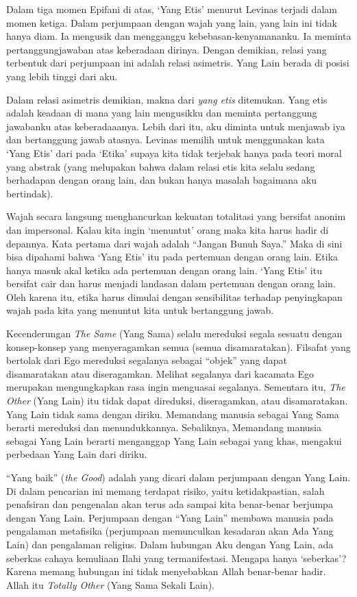 \documentclass[10pt,a4paper]{article}
\begin{document}
\begin{multicols}{2}
Dalam tiga momen Epifani di atas, `Yang Etis' menurut Levinas terjadi
dalam momen ketiga. Dalam perjumpaan dengan wajah yang lain, yang lain
ini tidak hanya diam. Ia mengusik dan mengganggu kebebasan-kenyamananku.
Ia meminta pertanggungjawaban atas keberadaan dirinya. Dengan demikian,
relasi yang terbentuk dari perjumpaan ini adalah relasi asimetris. Yang
Lain berada di posisi yang lebih tinggi dari aku.

Dalam relasi asimetris demikian, makna dari \emph{yang etis} ditemukan.
Yang etis adalah keadaan di mana yang lain mengusikku dan meminta
pertanggung jawabanku atas keberadaaanya. Lebih dari itu, aku diminta
untuk menjawab iya dan bertanggung jawab atasnya. Levinas memilih untuk
menggunakan kata `Yang Etis' dari pada `Etika' supaya kita tidak
terjebak hanya pada teori moral yang abstrak (yang melupakan bahwa dalam
relasi etis kita selalu sedang berhadapan dengan orang lain, dan bukan
hanya masalah bagaimana aku bertindak).

Wajah secara langsung menghancurkan kekuatan totalitasi yang bersifat
anonim dan impersonal. Kalau kita ingin `menuntut' orang maka kita harus
hadir di depannya. Kata pertama dari wajah adalah ``Jangan Bunuh Saya.''
Maka di sini bisa dipahami bahwa `Yang Etis' itu pada pertemuan dengan
orang lain. Etika hanya masuk akal ketika ada pertemuan dengan orang
lain. `Yang Etis' itu bersifat cair dan harus menjadi landasan dalam
pertemuan dengan orang lain. Oleh karena itu, etika harus dimulai dengan
sensibilitas terhadap penyingkapan wajah pada kita yang menuntut kita
untuk bertanggung jawab.

Kecenderungan \emph{The Same} (Yang Sama) selalu mereduksi segala
sesuatu dengan konsep-konsep yang menyeragamkan semua (semua
disamaratakan). Filsafat yang bertolak dari Ego mereduksi segalanya
sebagai ``objek'' yang dapat disamaratakan atau diseragamkan. Melihat
segalanya dari kacamata Ego merupakan mengungkapkan rasa ingin menguasai
segalanya. Sementara itu, \emph{The Other} (Yang Lain) itu tidak dapat
direduksi, diseragamkan, atau disamaratakan. Yang Lain tidak sama dengan
diriku. Memandang manusia sebagai Yang Sama berarti mereduksi dan
menundukkannya. Sebaliknya, Memandang manusia sebagai Yang Lain berarti
menganggap Yang Lain sebagai yang khas, mengakui perbedaan Yang Lain
dari diriku.

``Yang baik'' (\emph{the Good}) adalah yang dicari dalam perjumpaan
dengan Yang Lain. Di dalam pencarian ini memang terdapat risiko, yaitu
ketidakpastian, salah penafsiran dan pengenalan akan terus ada sampai
kita benar-benar berjumpa dengan Yang Lain. Perjumpaan dengan ``Yang
Lain'' membawa manusia pada pengalaman metafisika (perjumpaan
memunculkan kesadaran akan Ada Yang Lain) dan pengalaman religius. Dalam
hubungan Aku dengan Yang Lain, ada seberkas cahaya kemuliaan Ilahi yang
termanifestasi. Mengapa hanya `seberkas'? Karena memang hubungan ini
tidak menyebabkan Allah benar-benar hadir. Allah itu \emph{Totally
Other} (Yang Sama Sekali Lain).


\end{multicols}
\end{document}
